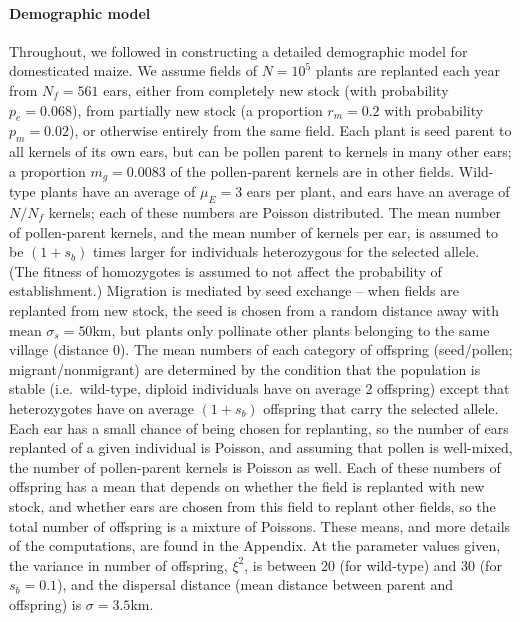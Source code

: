 \paragraph{Demographic model}
Throughout, we followed \citet{vanHeerwaarden2010} in constructing a detailed demographic model for domesticated maize.
We assume fields of $N=10^5$ plants are replanted each year from $N_f=561$ ears, either from completely new stock (with probability $p_e=0.068$), from partially new stock (a proportion $r_m=0.2$ with probability $p_m=0.02$), or  otherwise entirely from the same field.
Each plant is seed parent to all kernels of its own ears, but can be pollen parent to kernels in many other ears; a proportion $m_g=0.0083$ of the pollen-parent kernels are in other fields.
Wild-type plants have an average of $\mu_E=3$ ears per plant, and ears have an average of $N/N_f$ kernels; each of these numbers are Poisson distributed.
The mean number of pollen-parent kernels, and the mean number of kernels per ear, is assumed to be $(1+s_b)$ times larger for individuals heterozygous for the selected allele.
(The fitness of homozygotes is assumed to not affect the probability of establishment.)
Migration is mediated by seed exchange -- when fields are replanted from new stock, the seed is chosen from a random distance away with mean $\sigma_s=50$km, but plants only pollinate other plants belonging to the same village (distance 0).
The mean numbers of each category of offspring (seed/pollen; migrant/nonmigrant) are determined by the condition that the population is stable 
(i.e.\ wild-type, diploid individuals have on average 2 offspring) 
except that heterozygotes have on average $(1+s_b)$ offspring that carry the selected allele.
Each ear has a small chance of being chosen for replanting, so the number of ears replanted of a given individual is Poisson, and assuming that pollen is well-mixed, the number of pollen-parent kernels is Poisson as well.
Each of these numbers of offspring has a mean that depends on whether the field is replanted with new stock, and whether ears are chosen from this field to replant other fields, so the total number of offspring is a mixture of Poissons. 
These means, and more details of the computations, are found in the Appendix. %
At the parameter values given, the variance in number of offspring, $\xi^2$, is between 20 (for wild-type) and 30 (for $s_b=0.1$), 
and the dispersal distance (mean distance between parent and offspring) is $\sigma=3.5$km.

